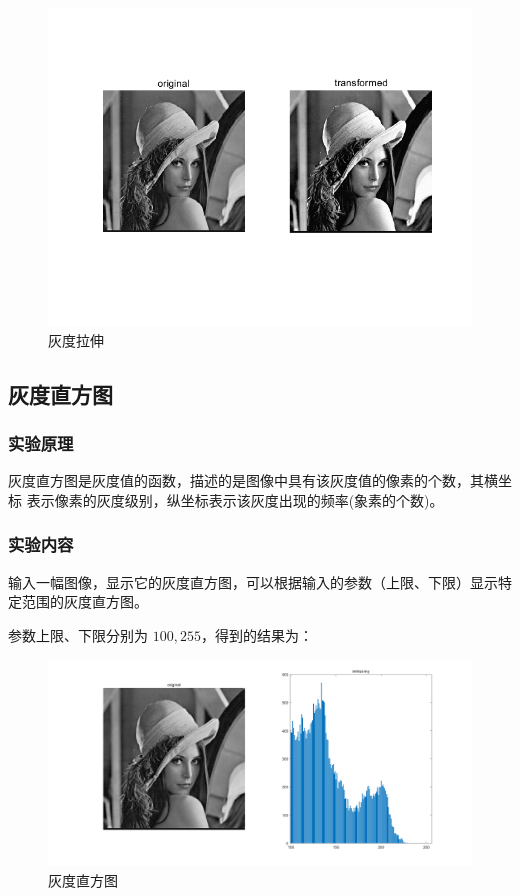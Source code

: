 \documentclass{ctexart}
\begin{document}
\begin{figure}[H]
    \centering
    \includegraphics[scale=0.4]{2_2.png}
    \caption{灰度拉伸}
\end{figure}
\subsection{\hei 灰度直方图}
\subsubsection{\hei 实验原理}
灰度直方图是灰度值的函数，描述的是图像中具有该灰度值的像素的个数，其横坐标
表示像素的灰度级别，纵坐标表示该灰度出现的频率(象素的个数)。

\subsubsection{\hei 实验内容}
输入一幅图像，显示它的灰度直方图，可以根据输入的参数（上限、下限）显示特
定范围的灰度直方图。
\par 参数上限、下限分别为
$100, 255$，得到的结果为：  
\begin{figure}[H]
    \centering
    \includegraphics[scale=0.2]{2_3.png}
    \caption{灰度直方图}
\end{figure} 
\end{document}
